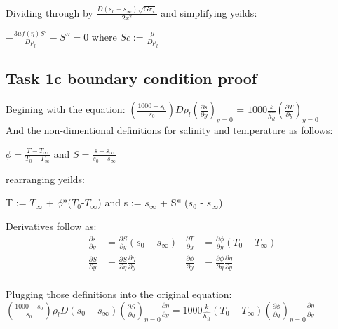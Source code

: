 	\noindent Dividing through by $\frac{D(s_0-s_\infty)\sqrt{Gr_x}}{2 x^2}$ and simplifying yeilds:\\
	\begin{center}
		$-\frac{3 \mu  f(\eta ) S'}{D \rho_l}-S'' = 0$ where $Sc := \frac{\mu}{D \rho_l} $
	\end{center}


	\subsection*{Task 1c boundary condition proof} %
	\label{ssec:Task 1c}
	Begining with the equation: $\left( \frac{1000-s_0}{s_0} \right) D \rho_l \left( \frac{\partial s}{\partial y} \right)_{y = 0}$ = $1000 \frac{k}{\hat{h_{il}}}  \left (\frac{\partial T}{\partial y} \right)_{y = 0}$\\

	\noindent And the non-dimentional definitions for salinity and temperature as follows:\\
	\begin{center}
		$\phi = \frac{T-T_\infty}{T_0-T_\infty}$ and $S = \frac{s - s_\infty}{s_0 - s_\infty}$
	\end{center}

	\noindent rearranging yeilds:\\
	\begin{center}
		T := $T_\infty$ + $\phi$*($T_0$-$T_\infty$) and s := $s_\infty $ + S* ($s_0$ - $s_\infty $)
	\end{center}

	\noindent Derivatives follow as:\\
	\begin{align*}
		\frac{\partial s}{\partial y} &= \frac{\partial S}{\partial y}(s_0 - s_\infty) & 		\frac{\partial T}{\partial y} &= \frac{\partial \phi}{\partial y}(T_0 - T_\infty)\\
		\frac{\partial S}{\partial y} &=  \frac{\partial S}{\partial \eta}  \frac{\partial \eta}{\partial y} & \frac{\partial \phi}{\partial y} &=  \frac{\partial \phi}{\partial \eta}\frac{\partial \eta}{\partial y}\\
	\end{align*}

	\noindent Plugging those definitions into the original equation:\\
	$\left(\frac{1000 - s_0}{s_0}\right) \rho_l D (s_0 - s_\infty) \left(\frac{\partial S}{\partial \eta}\right)_{\eta = 0} \frac{\partial \eta}{\partial y} = 1000 \frac{k}{\hat{h_{il}}} (T_0 - T_\infty) \left(\frac{\partial \phi}{\partial \eta}\right)_{\eta = 0}\frac{\partial \eta}{\partial y}$\\

